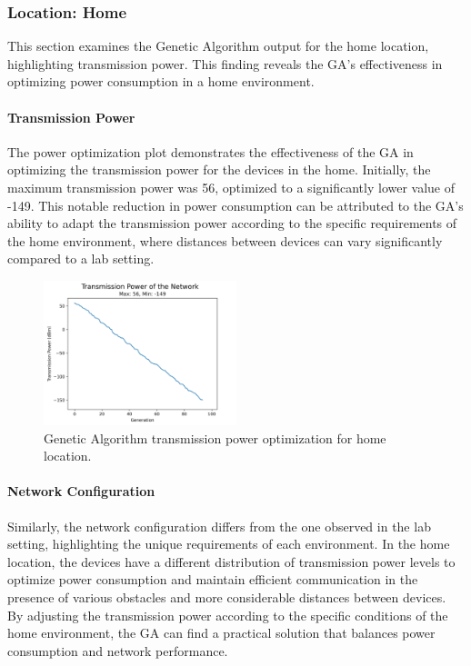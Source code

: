 \subsubsection{Location: Home}
This section examines the Genetic Algorithm output for the home location, highlighting transmission power. This finding reveals the GA's effectiveness in optimizing power consumption in a home environment.

\paragraph{Transmission Power}
The power optimization plot demonstrates the effectiveness of the GA in optimizing the transmission power for the devices in the home. Initially, the maximum transmission power was 56, optimized to a significantly lower value of -149. This notable reduction in power consumption can be attributed to the GA's ability to adapt the transmission power according to the specific requirements of the home environment, where distances between devices can vary significantly compared to a lab setting.

\begin{figure}[h]
  \centering
  \includegraphics[width=0.5\textwidth]{images/research_results/genetic_algorithm_home_power.png}
    \caption{Genetic Algorithm transmission power optimization for home location.}
    \label{fig:genetic_algorithm_home_power}
\end{figure}

\paragraph{Network Configuration}
Similarly, the network configuration differs from the one observed in the lab setting, highlighting the unique requirements of each environment. In the home location, the devices have a different distribution of transmission power levels to optimize power consumption and maintain efficient communication in the presence of various obstacles and more considerable distances between devices. By adjusting the transmission power according to the specific conditions of the home environment, the GA can find a practical solution that balances power consumption and network performance.

